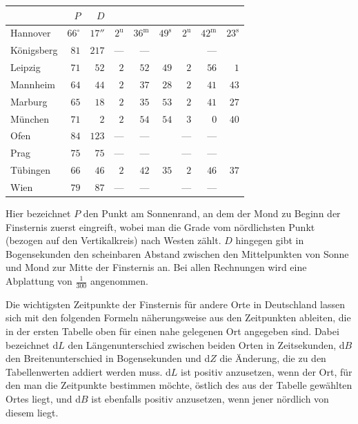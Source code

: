 \begin{center}\small\setlength{\tabcolsep}{3pt}
\begin{tabular}{l|r|r|rrr|rrr}
  &  $P$  &  $D$  &    &    \\
\hline
 Hannover  &  $66^\circ$  &  $17''$  &  $2^{\mathrm u}$  &  $36^{\mathrm m}$  &  $49^{\mathrm s}$  &  $2^{\mathrm u}$  &  $42^{\mathrm m}$  &  $23^{\mathrm s}$ \\
 Königsberg  &  $81$  &  $217$  &  ---  &  ---  &   &  & --- &  \\
 Leipzig  &  $71$  &  $52$  &  $2$  &  $52$  &  $49$  &  $2$  &  $56$  &  $1$ \\
 Mannheim  &  $64$  &  $44$  &  $2$  &  $37$  &  $28$  &  $2$  &  $41$  &  $43$ \\
 Marburg  &  $65$  &  $18$  &  $2$  &  $35$  &  $53$  &  $2$  &  $41$  &  $27$ \\
 München  &  $71$  &  $2$  &  $2$  &  $54$  &  $54$  &  $3$  &  $0$  &  $40$ \\
 Ofen  &  $84$  &  $123$  &  ---  &  ---  &   &  ---  &  ---  &  \\
 Prag  &  $75$  &  $75$  &  ---  &  ---  &   &  ---  &  ---  &  \\
 Tübingen  &  $66$  &  $46$  &  $2$  &  $42$  &  $35$  &  $2$  &  $46$  &  $37$ \\
 Wien  &  $79$  &  $87$  &  ---  &  ---  &   &  ---  &  ---  &  \\
\end{tabular}
\end{center}

Hier bezeichnet $P$ den Punkt am Sonnenrand, an dem der Mond zu Beginn der Finsternis zuerst eingreift, wobei man die Grade vom nördlichsten Punkt (bezogen auf den Vertikalkreis) nach  Westen zählt. $D$ hingegen gibt in Bogensekunden den scheinbaren Abstand zwischen den Mittelpunkten von Sonne und Mond zur Mitte der Finsternis an. Bei allen Rechnungen wird eine Abplattung von $\tfrac{1}{300}$ angenommen.

Die wichtigsten Zeitpunkte der Finsternis für andere Orte in Deutschland lassen sich mit den folgenden Formeln näherungsweise aus den Zeitpunkten ableiten, die in der ersten Tabelle oben für einen nahe gelegenen Ort angegeben sind. Dabei bezeichnet d$L$ den Längenunterschied zwischen beiden Orten in Zeitsekunden, d$B$ den Breitenunterschied in Bogensekunden und d$Z$ die Änderung, die zu den Tabellenwerten addiert werden muss. d$L$ ist positiv anzusetzen, wenn der Ort, für den man die Zeitpunkte bestimmen möchte, östlich des aus der Tabelle gewählten Ortes liegt, und d$B$ ist ebenfalls positiv anzusetzen, wenn jener nördlich von diesem liegt.


